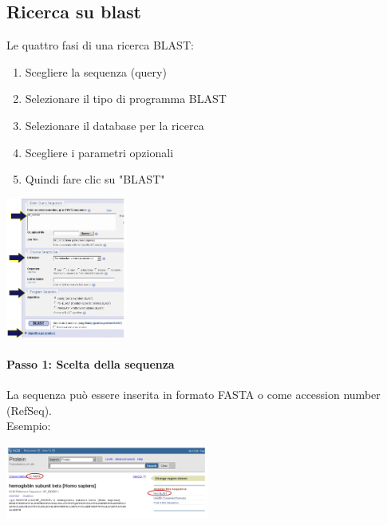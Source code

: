 \documentclass{article}
\begin{document}
\subsection{Ricerca su blast}
Le quattro fasi di una ricerca BLAST:
\begin{enumerate}
    \item Scegliere la sequenza (query)
    \item Selezionare il tipo di programma BLAST
    \item Selezionare il database per la ricerca
    \item Scegliere i parametri opzionali
    \item Quindi fare clic su "BLAST"
\end{enumerate}
\begin{center}
    \includegraphics[width=0.3\textwidth]{figures/blast.png}
\end{center}
\paragraph{Passo 1: Scelta della sequenza}
La sequenza può essere inserita in
formato FASTA o come accession
number (RefSeq).\\Esempio:
\begin{center}
    \includegraphics[width=0.5\textwidth]{figures/blast1.png}
\end{center}
\end{document}
